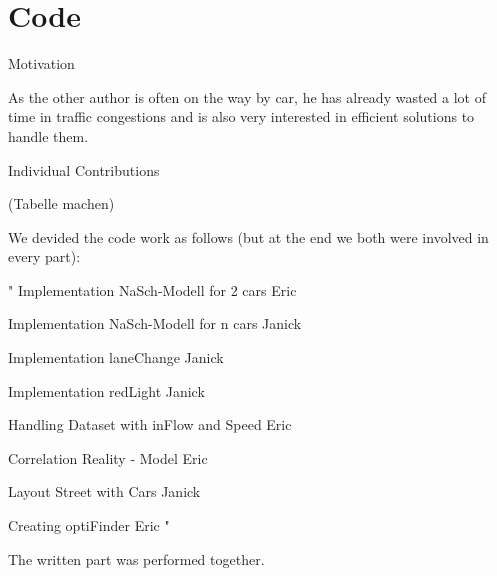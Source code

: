 \section*{Code}





Motivation

As the other author is often on the way by car, he has already wasted a lot of time in traffic congestions and is also
very interested in efficient solutions to handle them.

Individual Contributions


(Tabelle machen)

We devided the code work as follows (but at the end we both were involved in every part):

"
Implementation NaSch-Modell for 2 cars  Eric

Implementation NaSch-Modell for n cars  Janick

Implementation laneChange Janick

Implementation redLight Janick

Handling Dataset with inFlow and Speed  Eric

Correlation Reality - Model Eric

Layout Street with Cars  Janick

Creating optiFinder Eric
"

The written part was performed together.
